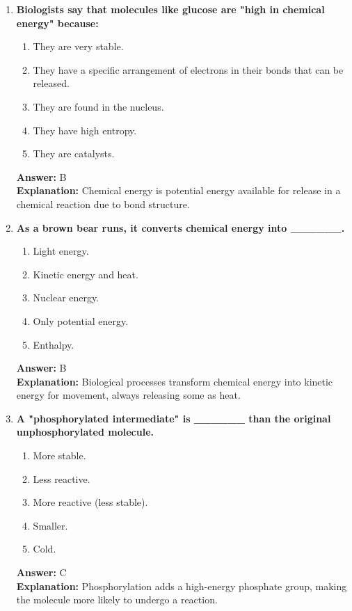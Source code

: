 \documentclass[11pt, a4paper]{article}
\begin{document}
\begin{enumerate}[leftmargin=*, label=\arabic*.]
\item \textbf{Biologists say that molecules like glucose are "high in chemical energy" because:}
\begin{enumerate}[label=\Alph*.]
    \item They are very stable.
    \item They have a specific arrangement of electrons in their bonds that can be released.
    \item They are found in the nucleus.
    \item They have high entropy.
    \item They are catalysts.
\end{enumerate}
\textbf{Answer:} B \\
\textbf{Explanation:} Chemical energy is potential energy available for release in a chemical reaction due to bond structure.

\item \textbf{As a brown bear runs, it converts chemical energy into \_\_\_\_\_\_.}
\begin{enumerate}[label=\Alph*.]
    \item Light energy.
    \item Kinetic energy and heat.
    \item Nuclear energy.
    \item Only potential energy.
    \item Enthalpy.
\end{enumerate}
\textbf{Answer:} B \\
\textbf{Explanation:} Biological processes transform chemical energy into kinetic energy for movement, always releasing some as heat.

\item \textbf{A "phosphorylated intermediate" is \_\_\_\_\_\_ than the original unphosphorylated molecule.}
\begin{enumerate}[label=\Alph*.]
    \item More stable.
    \item Less reactive.
    \item More reactive (less stable).
    \item Smaller.
    \item Cold.
\end{enumerate}
\textbf{Answer:} C \\
\textbf{Explanation:} Phosphorylation adds a high-energy phosphate group, making the molecule more likely to undergo a reaction.


\end{enumerate}
\end{document}
